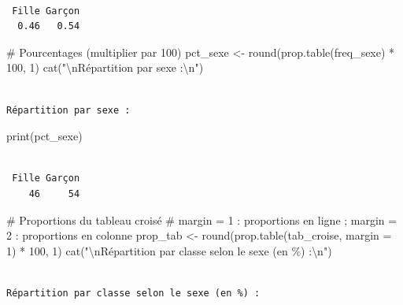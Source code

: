 \documentclass[
  french,
  11pt,
  a4paper,
]{article}
\newenvironment{Shaded}{}{}
\newcommand{\AttributeTok}[1]{\textcolor[rgb]{0.84,0.23,0.29}{#1}}
\newcommand{\CommentTok}[1]{\textcolor[rgb]{0.42,0.45,0.49}{#1}}
\newcommand{\DecValTok}[1]{\textcolor[rgb]{0.00,0.36,0.77}{#1}}
\newcommand{\FunctionTok}[1]{\textcolor[rgb]{0.44,0.26,0.76}{#1}}
\newcommand{\NormalTok}[1]{\textcolor[rgb]{0.14,0.16,0.18}{#1}}
\newcommand{\OtherTok}[1]{\textcolor[rgb]{0.44,0.26,0.76}{#1}}
\newcommand{\SpecialCharTok}[1]{\textcolor[rgb]{0.00,0.36,0.77}{#1}}
\newcommand{\StringTok}[1]{\textcolor[rgb]{0.01,0.18,0.38}{#1}}
\begin{document}
\begin{verbatim}

 Fille Garçon 
  0.46   0.54 
\end{verbatim}

\begin{Shaded}
\begin{Highlighting}[]
\CommentTok{\# Pourcentages (multiplier par 100)}
\NormalTok{pct\_sexe }\OtherTok{\textless{}{-}} \FunctionTok{round}\NormalTok{(}\FunctionTok{prop.table}\NormalTok{(freq\_sexe) }\SpecialCharTok{*} \DecValTok{100}\NormalTok{, }\DecValTok{1}\NormalTok{)}
\FunctionTok{cat}\NormalTok{(}\StringTok{"}\SpecialCharTok{\textbackslash{}n}\StringTok{Répartition par sexe :}\SpecialCharTok{\textbackslash{}n}\StringTok{"}\NormalTok{)}
\end{Highlighting}
\end{Shaded}

\begin{verbatim}

Répartition par sexe :
\end{verbatim}

\begin{Shaded}
\begin{Highlighting}[]
\FunctionTok{print}\NormalTok{(pct\_sexe)}
\end{Highlighting}
\end{Shaded}

\begin{verbatim}

 Fille Garçon 
    46     54 
\end{verbatim}

\begin{Shaded}
\begin{Highlighting}[]
\CommentTok{\# Proportions du tableau croisé}
\CommentTok{\# margin = 1 : proportions en ligne ; margin = 2 : proportions en colonne}
\NormalTok{prop\_tab }\OtherTok{\textless{}{-}} \FunctionTok{round}\NormalTok{(}\FunctionTok{prop.table}\NormalTok{(tab\_croise, }\AttributeTok{margin =} \DecValTok{1}\NormalTok{) }\SpecialCharTok{*} \DecValTok{100}\NormalTok{, }\DecValTok{1}\NormalTok{)}
\FunctionTok{cat}\NormalTok{(}\StringTok{"}\SpecialCharTok{\textbackslash{}n}\StringTok{Répartition par classe selon le sexe (en \%) :}\SpecialCharTok{\textbackslash{}n}\StringTok{"}\NormalTok{)}
\end{Highlighting}
\end{Shaded}

\begin{verbatim}

Répartition par classe selon le sexe (en %) :
\end{verbatim}
\end{document}
